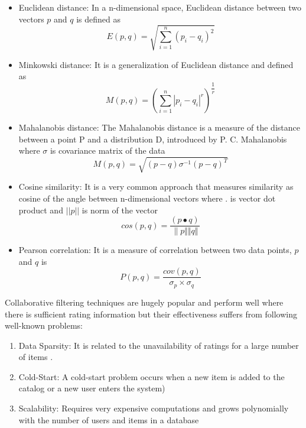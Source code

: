 \documentclass[12pt]{article}
\begin{document}
\begin{itemize}
	\item Euclidean distance: In a n{}-dimensional space, Euclidean distance between two vectors $p$ and $q$ is defined as
	\begin{equation}
	E(p, q) = \sqrt{\sum_{i=1}^n (p_{i} - q_{i})^{2}}
	\end{equation} 
\end{itemize}
\begin{itemize}
	\item Minkowski distance: It is a generalization of Euclidean distance and defined as
	\begin{equation}
	M(p, q) = ({\sum_{i=1}^n |p_{i} - q_{i}|^{r}})^{\dfrac{1}{r}}
	\end{equation} 
\end{itemize}
\begin{itemize}
	\item Mahalanobis distance: The Mahalanobis distance is a measure of the distance between a point P and a distribution D, introduced by P. C. Mahalanobis \cite{mahalanobis} where $\sigma$ is covariance matrix of the data
	\begin{equation}
	M(p, q) = \sqrt{(p - q) \sigma^{-1} (p - q)^{T}}
	\end{equation} 
\end{itemize}
\begin{itemize}
	\item Cosine similarity: It is a very common approach that measures similarity as cosine of the angle between n-dimensional vectors where $.$ is vector dot product and $ ||p|| $ is  norm of the vector
	\begin{equation}
	cos(p, q) = \dfrac{(p \bullet q)}{\lVert p \Vert \Vert q \Vert}
	\end{equation} 
\end{itemize}
\begin{itemize}
	\item Pearson correlation: It is a measure of correlation between two data points, $p$ and $q$ is
	\begin{equation}
	P(p, q) = \dfrac{cov(p, q)}{\sigma _{p} \times \sigma _{q}}
	\end{equation} 
\end{itemize}
Collaborative filtering techniques are hugely popular and perform well where there is sufficient rating information but their effectiveness suffers from following well-known problems:
\begin{enumerate}
	\item Data Sparsity: It is related to the unavailability of ratings for a large number of items \cite{linden}. 
	\item Cold-Start: A cold-start problem occurs when a new item is added to the catalog or a new user enters the system) \cite{schein}
	\item Scalability: Requires very expensive computations and grows polynomially with the number of users and items in a database \cite{papagelis}
\end{enumerate}
\end{document}
